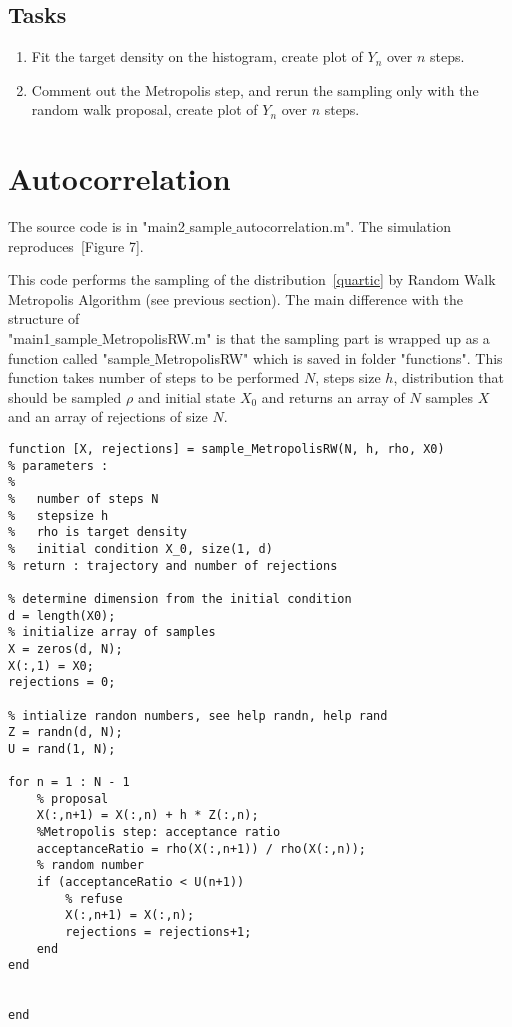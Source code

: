 \documentclass{scrartcl}
\begin{document}
\subsection{Tasks}
\begin{enumerate}
\item Fit the target density on the histogram, create plot of $Y_n$ over $n $ steps.
\item Comment out the Metropolis step, and rerun the sampling only with the random walk proposal, create plot of $Y_n$ over $n $ steps.
\end{enumerate}


\section{Autocorrelation}

The source code is in "main2$\_$sample$\_$autocorrelation.m". The simulation reproduces~\cite{sanz2014markov}[Figure 7].

This code performs the sampling of the distribution~\eqref{quartic} by Random Walk Metropolis Algorithm (see previous section). The main difference with the structure of \\ "main1$\_$sample$\_$MetropolisRW.m" is that the sampling part is wrapped up as a function called "sample$\_$MetropolisRW" which is saved in folder "functions". This function takes number of steps to be performed $N$, steps size $h$, distribution that should be sampled $\rho$ and initial state $X_0$ and returns an array of $N$ samples $X$ and an array of rejections of size $N$.
\begin{verbatim}
function [X, rejections] = sample_MetropolisRW(N, h, rho, X0)
% parameters :
%  
%   number of steps N
%   stepsize h
%   rho is target density
%   initial condition X_0, size(1, d)
% return : trajectory and number of rejections

% determine dimension from the initial condition
d = length(X0);
% initialize array of samples
X = zeros(d, N); 
X(:,1) = X0;
rejections = 0;

% intialize randon numbers, see help randn, help rand
Z = randn(d, N);
U = rand(1, N);

for n = 1 : N - 1   
    % proposal 
    X(:,n+1) = X(:,n) + h * Z(:,n);    
    %Metropolis step: acceptance ratio
    acceptanceRatio = rho(X(:,n+1)) / rho(X(:,n));    
    % random number    
    if (acceptanceRatio < U(n+1))
        % refuse
        X(:,n+1) = X(:,n);
        rejections = rejections+1;
    end
end


end
\end{verbatim}
\end{document}
